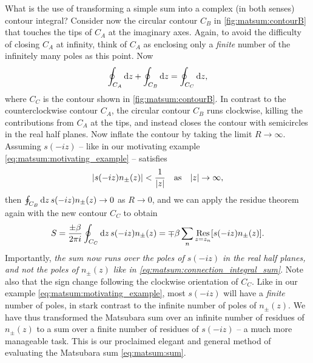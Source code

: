 What is the use of transforming a simple sum into a complex (in both senses) contour integral?
Consider now the circular contour $C_B$ in \cref{fig:matsum:contourB} that touches the tips of $C_A$ at the imaginary axes.
Again, to avoid the difficulty of closing $C_A$ at infinity, think of $C_A$ as enclosing only a \emph{finite} number of the infinitely many poles as this point.
Now
\begin{equation}
	\oint_{C_A} \mathop{}\!\mathrm{d} z +
	\oint_{C_B} \mathop{}\!\mathrm{d} z =
	\oint_{C_C} \mathop{}\!\mathrm{d} z ,
\end{equation}
where $C_C$ is the contour shown in \cref{fig:matsum:contourB}.
In contrast to the counterclockwise contour $C_A$, the circular contour $C_B$ runs clockwise, killing the contributions from $C_A$ at the tips, and instead closes the contour with semicircles in the real half planes.
Now inflate the contour by taking the limit $R \rightarrow \infty$.
Assuming $s(-i z)$ -- like in our motivating example \eqref{eq:matsum:motivating_example} -- satisfies
\begin{equation}
	\lvert s(-iz) n_\pm(z) \rvert < \frac{1}{\lvert z \rvert} \quad \text{as} \quad \lvert z \rvert \rightarrow \infty ,
\end{equation}
then $\oint_{C_B} \mathop{}\!\mathrm{d} z \, s(-iz) n_\pm(z) \rightarrow 0$ as $R \rightarrow 0$, and we can apply the residue theorem again with the new contour $C_C$ to obtain
\begin{equation}
	S = \frac{\pm \beta}{2 \pi i} \oint_{C_C} \mathop{}\!\mathrm{d} z \, s(-iz) n_\pm(z) = \mp \beta \sum_n \operatorname*{Res}_{z=z_n} [s(-iz) n_\pm(z)] .
\label{eq:matsum:sum_finite_residues}
\end{equation}
Importantly, \emph{the sum now runs over the poles of $s(-iz)$ in the real half planes, and not the poles of $n_\pm(z)$ like in \cref{eq:matsum:connection_integral_sum}}.
Note also that the sign change following the clockwise orientation of $C_C$.
Like in our example \eqref{eq:matsum:motivating_example}, most $s(-iz)$ will have a \emph{finite} number of poles, in stark contrast to the infinite number of poles of $n_\pm(z)$.
We have thus transformed the Matsubara sum over an infinite number of residues of $n_\pm(z)$ to a sum over a finite number of residues of $s(-iz)$ -- a much more manageable task.
This is our proclaimed elegant and general method of evaluating the Matsubara sum \eqref{eq:matsum:sum}.


